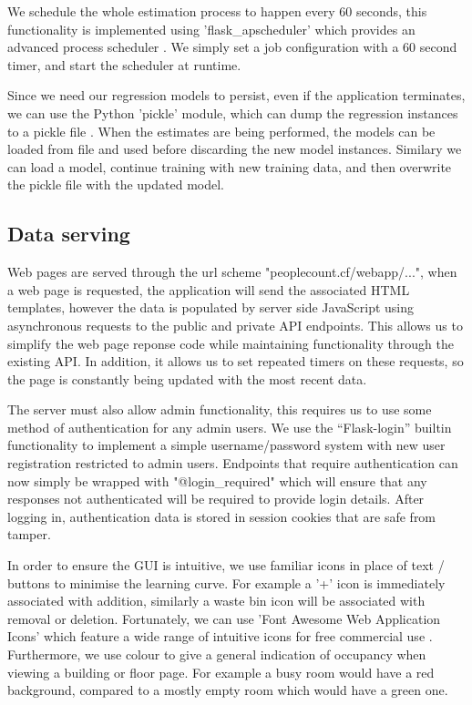 \documentclass{l4proj}
\begin{document}
We schedule the whole estimation process to happen every 60 seconds, this functionality is implemented using 'flask\_apscheduler' which provides an advanced process scheduler \cite{c-flaskap}. We simply set a job configuration with a 60 second timer, and start the scheduler at runtime.

Since we need our regression models to persist, even if the application terminates, we can use the Python 'pickle' module, which can dump the regression instances to a pickle file \cite{c-pickle}. When the estimates are being performed, the models can be loaded from file and used before discarding the new model instances. Similary we can load a model, continue training with new training data, and then overwrite the pickle file with the updated model.


\subsection{Data serving}
Web pages are served through the url scheme "peoplecount.cf/webapp/...", when a web page is requested, the application will send the associated HTML templates, however the data is populated by server side JavaScript using asynchronous requests to the public and private API endpoints. This allows us to simplify the web page reponse code while maintaining functionality through the existing API. In addition, it allows us to set repeated timers on these requests, so the page is constantly being updated with the most recent data.

The server must also allow admin functionality, this requires us to use some method of authentication for any admin users. We use the “Flask-login” builtin functionality to implement a simple username/password system with new user registration restricted to admin users\cite{c-flasklogin}. Endpoints that require authentication can now simply be wrapped with "@login\_required" which will ensure that any responses not authenticated will be required to provide login details. After logging in, authentication data is stored in session cookies that are safe from tamper.

In order to ensure the GUI is intuitive, we use familiar icons in place of text / buttons to minimise the learning curve. For example a '+' icon is immediately associated with addition, similarly a waste bin icon will be associated with removal or deletion. Fortunately, we can use 'Font Awesome Web Application Icons' which feature a wide range of intuitive icons for free commercial use \cite{c-fawai}. Furthermore, we use colour to give a general indication of occupancy when viewing a building or floor page. For example a busy room would have a red background, compared to a mostly empty room which would have a green one.
\end{document}
